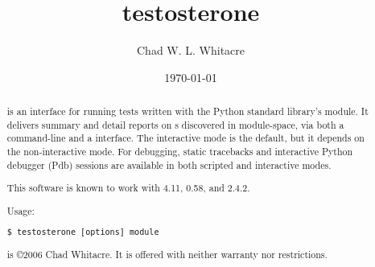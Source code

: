 \documentclass{manual}
\title{testosterone}
\author{Chad W. L. Whitacre}
\date\today
\begin{document}
\maketitle

\begin{abstract}

\noindent

 is an interface for running tests written with the Python
standard library's  module. It delivers summary and detail
reports on s discovered in module-space, via both a command-line
and a  interface. The interactive mode is the default, but it
depends on the non-interactive mode. For debugging, static tracebacks and
interactive Python debugger (Pdb) sessions are available in both scripted and
interactive modes.

This software is known to work with 
4.11,  0.58,
and  2.4.2.

Usage:

\begin{verbatim}
$ testosterone [options] module
\end{verbatim}

 is \copyright 2006 Chad Whitacre. It is offered with
neither warranty nor restrictions.




\end{abstract}




\end{document}
